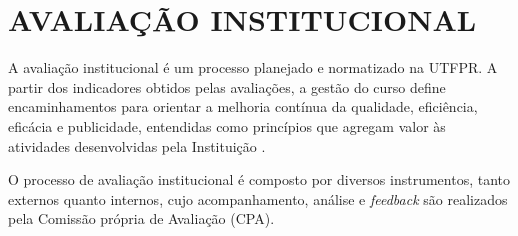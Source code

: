 \chapter{AVALIAÇÃO INSTITUCIONAL}

A avaliação institucional é um processo planejado e normatizado na UTFPR. A partir dos indicadores obtidos pelas avaliações, a gestão do curso define encaminhamentos para orientar a melhoria contínua da qualidade, eficiência, eficácia e publicidade, entendidas como princípios que agregam valor às atividades desenvolvidas pela Instituição \cite{pdiutfpr}. 

O processo de avaliação institucional é composto por diversos instrumentos, tanto externos quanto internos, cujo acompanhamento, análise e \textit{feedback} são realizados pela Comissão própria de Avaliação (CPA).

